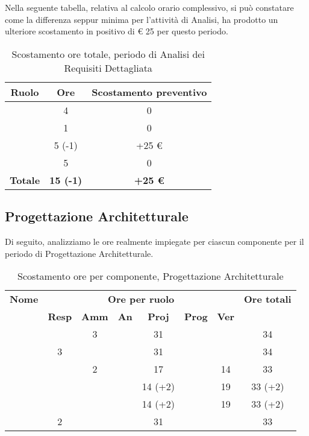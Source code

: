 Nella seguente tabella, relativa al calcolo orario complessivo, si può constatare come la differenza seppur minima per l'attività di Analisi, ha prodotto un ulteriore scostamento in positivo di € 25 per questo periodo.

\begin{table}[H]
	\begin{center}
		\begin{tabular}{|c|c|c|}
			\hline
			\textbf{Ruolo}	& \textbf{Ore}	& \textbf{Scostamento preventivo} \\
			\hline
			\Res	&   4 	&  0  \\
			\hline
			\Amm	&   1	&  0	\\
			\hline
			\Ana	&   5 (-1)	&  +25 €	\\
			\hline
			\Ver	&   5	&  0	\\
			\hline
			\textbf{Totale} & \textbf{15 (-1)} & \textbf{+25 €}\\
			\hline
		\end{tabular}
	\end{center}
	\caption{Scostamento ore totale, periodo di Analisi dei Requisiti Dettagliata}
\end{table}

\subsection{Progettazione Architetturale}

Di seguito, analizziamo le ore realmente impiegate per ciascun componente per il periodo di Progettazione Architetturale.

\begin{table}[H]
	\begin{center}
		\begin{tabular}{|c|c|c|c|c|c|c|c|}
			\hline
			\textbf{Nome} & \multicolumn{6}{c|}{\textbf{Ore per ruolo}} & \textbf{Ore totali} \\\cline{2-7}
			& \textbf{Resp} & \textbf{Amm} & \textbf{An} & \textbf{Proj} & \textbf{Prog} & \textbf{Ver} & \\
			\hline
			\MC			&		&	3	&		&	31	&		&		&   34	\\
			\hline
			\AN			&	3	&		&		&	31	&		&		& 	34	\\
			\hline
			\DAN		&		&	2	&		&	17	&		&	14	&	33	\\
			\hline
			\AS			&		&	 	&	 	&	14 (+2)	&	 	& 	19	&	33 (+2)	\\
			\hline
			\NS 		&		&		&		&	14 (+2)	&		& 	19	&	33 (+2)	\\
			\hline
			\DS			& 	2	&		&		&	31	&		&		&	33	\\
			\hline
		\end{tabular}
	\end{center}
	\caption{Scostamento ore per componente, Progettazione Architetturale}
\end{table}

